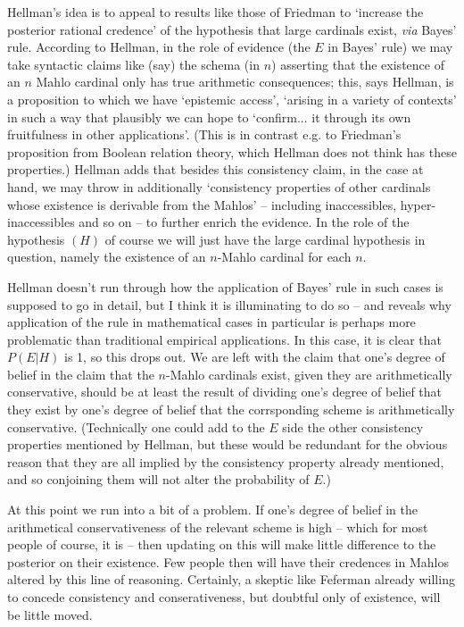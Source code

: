 \documentclass{amsart}
\theoremstyle{definition}
\begin{document}
Hellman's idea is to appeal to results like those of Friedman 
to `increase the posterior rational credence' of the hypothesis that large 
cardinals exist, \emph{via}  Bayes' rule. According to Hellman, 
in the role of evidence (the $E$ in Bayes' rule) we may take syntactic 
claims like (say) the schema (in $n$) asserting that the existence of an $n$ Mahlo cardinal
only has true arithmetic consequences; this, says Hellman, is a proposition to which 
we have `epistemic access', `arising in a variety of contexts' in such a way that
plausibly we can hope to `confirm... it through its own fruitfulness in other applications'.
(This is in contrast e.g. to Friedman's proposition from Boolean relation theory,
which Hellman does not think has these properties.) Hellman adds that besides this
consistency claim, in the case at hand, we may throw in additionally `consistency 
properties of other cardinals whose existence is derivable from the Mahlos' -- 
including inaccessibles, hyper-inaccessibles and so on -- 
to further enrich the evidence. In the role of the hypothesis $(H)$ of course
we will just have the large cardinal hypothesis in question, namely 
the existence of an $n$-Mahlo cardinal for each $n$. 

Hellman doesn't run through how the application of Bayes' rule in 
such cases is supposed to go in detail, but I think it is illuminating to do so 
-- and reveals why application of the rule in mathematical cases in particular 
is perhaps more problematic than traditional empirical applications. 
In this case, it is clear that $P(E|H)$ is 1, so this drops out. 
We are left with the claim that one's degree of belief in the claim that 
the $n$-Mahlo cardinals exist, given they are arithmetically conservative, should be at least 
the result of dividing one's degree of belief that they exist by 
one's degree of belief that the corrsponding scheme is arithmetically conservative. (Technically
one could add to the $E$ side the other consistency properties mentioned by Hellman,
but these would be redundant for the obvious reason that they are all implied by 
the consistency property already mentioned, and so conjoining them
will not alter the probability of $E$.)

At this point we run into a bit of a problem. If one's degree of belief 
in the arithmetical conservativeness of the relevant scheme is high -- which for most people 
of course, it is -- then updating on this will make little difference to the 
posterior on their existence. Few people then will have their credences in 
Mahlos altered by this line of reasoning. Certainly, a skeptic like Feferman already
willing to concede consistency and conserativeness, 
but doubtful only of existence, will be little moved.
\end{document}
